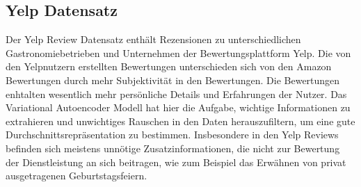 



\subsection{Yelp Datensatz}
Der Yelp Review Datensatz \citep{meansum} enthält Rezensionen zu unterschiedlichen Gastronomiebetrieben und Unternehmen der Bewertungsplattform Yelp. 
Die von den Yelpnutzern erstellten Bewertungen unterschieden sich von den Amazon Bewertungen durch mehr Subjektivität in den Bewertungen.
Die Bewertungen enhtalten wesentlich mehr persönliche Details und Erfahrungen der Nutzer.
Das Variational Autoencoder Modell hat hier die Aufgabe, wichtige Informationen zu extrahieren und unwichtiges Rauschen in den Daten herauszufiltern, um eine gute Durchschnittsrepräsentation zu bestimmen.
Insbesondere in den Yelp Reviews befinden sich meistens unnötige Zusatzinformationen, die nicht zur Bewertung der Dienstleistung an sich beitragen, wie zum Beispiel das Erwähnen von privat ausgetragenen Geburtstagsfeiern. 

